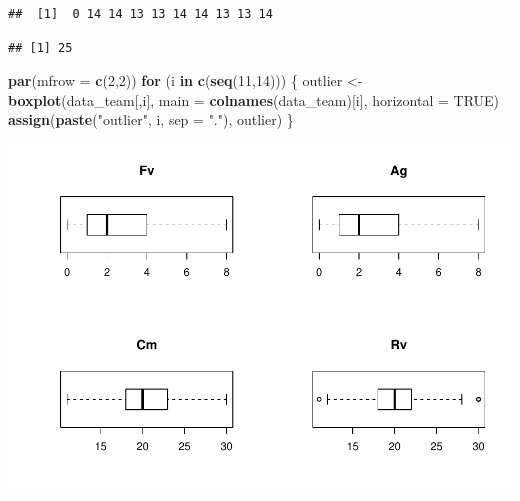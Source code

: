 \documentclass[
]{article}
\newenvironment{Shaded}{\begin{snugshade}}{\end{snugshade}}
\newcommand{\CommentTok}[1]{\textcolor[rgb]{0.56,0.35,0.01}{\textit{#1}}}
\newcommand{\ControlFlowTok}[1]{\textcolor[rgb]{0.13,0.29,0.53}{\textbf{#1}}}
\newcommand{\DataTypeTok}[1]{\textcolor[rgb]{0.13,0.29,0.53}{#1}}
\newcommand{\DecValTok}[1]{\textcolor[rgb]{0.00,0.00,0.81}{#1}}
\newcommand{\FloatTok}[1]{\textcolor[rgb]{0.00,0.00,0.81}{#1}}
\newcommand{\KeywordTok}[1]{\textcolor[rgb]{0.13,0.29,0.53}{\textbf{#1}}}
\newcommand{\NormalTok}[1]{#1}
\newcommand{\OperatorTok}[1]{\textcolor[rgb]{0.81,0.36,0.00}{\textbf{#1}}}
\newcommand{\OtherTok}[1]{\textcolor[rgb]{0.56,0.35,0.01}{#1}}
\newcommand{\StringTok}[1]{\textcolor[rgb]{0.31,0.60,0.02}{#1}}
\begin{document}
\begin{verbatim}
##  [1]  0 14 14 13 13 14 14 13 13 14
\end{verbatim}

\begin{Shaded}
\end{Shaded}

\begin{verbatim}
## [1] 25
\end{verbatim}

\newpage

\begin{Shaded}
\begin{Highlighting}[]
\KeywordTok{par}\NormalTok{(}\DataTypeTok{mfrow =} \KeywordTok{c}\NormalTok{(}\DecValTok{2}\NormalTok{,}\DecValTok{2}\NormalTok{))}
\ControlFlowTok{for}\NormalTok{ (i }\ControlFlowTok{in} \KeywordTok{c}\NormalTok{(}\KeywordTok{seq}\NormalTok{(}\DecValTok{11}\NormalTok{,}\DecValTok{14}\NormalTok{))) \{}
\NormalTok{  outlier <-}\StringTok{ }\KeywordTok{boxplot}\NormalTok{(data_team[,i], }\DataTypeTok{main =} \KeywordTok{colnames}\NormalTok{(data_team)[i], }\DataTypeTok{horizontal =} \OtherTok{TRUE}\NormalTok{)}
  \KeywordTok{assign}\NormalTok{(}\KeywordTok{paste}\NormalTok{(}\StringTok{"outlier"}\NormalTok{, i, }\DataTypeTok{sep =} \StringTok{"."}\NormalTok{), outlier)}
\NormalTok{\}}
\end{Highlighting}
\end{Shaded}

\includegraphics{practica2_files/figure-latex/unnamed-chunk-31-1.pdf}
\end{document}
